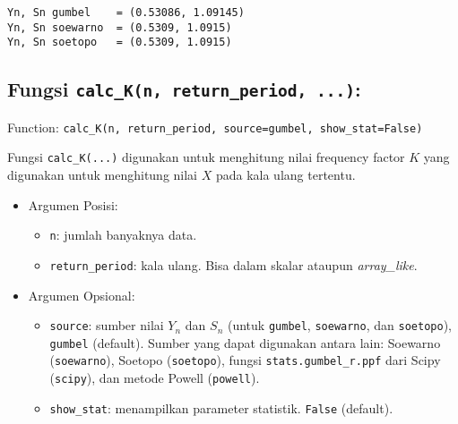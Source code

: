 \documentclass[11pt]{article}
\providecommand{\tightlist}{%
      \setlength{\itemsep}{0pt}\setlength{\parskip}{0pt}}
\begin{document}
    \begin{Verbatim}[commandchars=\\\{\}]
Yn, Sn gumbel    = (0.53086, 1.09145)
Yn, Sn soewarno  = (0.5309, 1.0915)
Yn, Sn soetopo   = (0.5309, 1.0915)
    \end{Verbatim}

    \hypertarget{fungsi-calc_kn-return_period-...}{%
\subsection{\texorpdfstring{Fungsi
\texttt{calc\_K(n,\ return\_period,\ ...)}:}{Fungsi calc\_K(n, return\_period, ...):}}\label{fungsi-calc_kn-return_period-...}}

Function:
\texttt{calc\_K(n,\ return\_period,\ source=\textquotesingle{}gumbel\textquotesingle{},\ show\_stat=False)}

Fungsi \texttt{calc\_K(...)} digunakan untuk menghitung nilai frequency
factor \(K\) yang digunakan untuk menghitung nilai \(X\) pada kala ulang
tertentu.

\begin{itemize}
\tightlist
\item
  Argumen Posisi:

  \begin{itemize}
  \tightlist
  \item
    \texttt{n}: jumlah banyaknya data.
  \item
    \texttt{return\_period}: kala ulang. Bisa dalam skalar ataupun
    \emph{array\_like}.
  \end{itemize}
\item
  Argumen Opsional:

  \begin{itemize}
  \tightlist
  \item
    \texttt{source}: sumber nilai \(Y_n\) dan \(S_n\) (untuk
    \texttt{\textquotesingle{}gumbel\textquotesingle{}},
    \texttt{\textquotesingle{}soewarno\textquotesingle{}}, dan
    \texttt{\textquotesingle{}soetopo\textquotesingle{}}),
    \texttt{\textquotesingle{}gumbel\textquotesingle{}} (default).
    Sumber yang dapat digunakan antara lain: Soewarno
    (\texttt{\textquotesingle{}soewarno\textquotesingle{}}), Soetopo
    (\texttt{\textquotesingle{}soetopo\textquotesingle{}}), fungsi
    \texttt{stats.gumbel\_r.ppf} dari Scipy
    (\texttt{\textquotesingle{}scipy\textquotesingle{}}), dan metode
    Powell (\texttt{\textquotesingle{}powell\textquotesingle{}}).
  \item
    \texttt{show\_stat}: menampilkan parameter statistik. \texttt{False}
    (default).
  \end{itemize}
\end{itemize}
\end{document}
